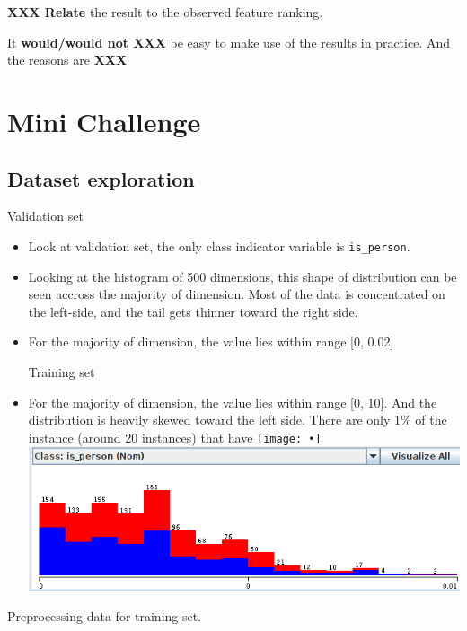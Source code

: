 \documentclass[12pt,journal,compsoc]{IEEEtran}
\begin{document}
\textbf{XXX Relate} the result to the observed feature ranking.

It \textbf{would/would not XXX} be easy to make use of the results in practice. And the reasons are \textbf{XXX}

\section{Mini Challenge}
\subsection*{Dataset exploration}
Validation set

\begin{itemize}
\item Look at validation set, the only class indicator variable is \texttt{is\_person}.

\item Looking at the histogram of 500 dimensions, this shape of distribution can be seen accross the majority of dimension. Most of the data is concentrated on the left-side, and the tail gets thinner toward the right side.

\item For the majority of dimension, the value lies within range [0, 0.02]

Training set
\item For the majority of dimension, the value lies within range [0, 10]. And the distribution is heavily skewed toward the left side. There are only 1\% of the instance (around 20 instances) that have 
\texttt{[image: •]}
\includegraphics[scale=0.3]{264_val}
\end{itemize}



Preprocessing data for training set.

\end{document}
